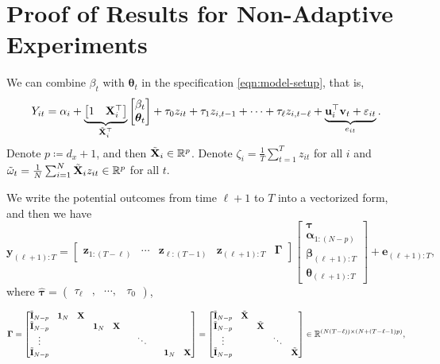 \section{Proof of Results for Non-Adaptive Experiments}\label{sec:constant-proof}

    
    
    
    We can combine $\beta_t$ with $\bm{\theta}_t$ in the specification \eqref{eqn:model-setup}, that is, 
		\[Y_{it}= \alpha_i + \underbrace{\begin{bmatrix}
			1 & \mathbf{X}^\top_i
			\end{bmatrix}}_{\tilde{\mathbf{X}}_i^\top}  \begin{bmatrix}
		\beta_t \\ \bm{\theta}_t
		\end{bmatrix} + \tau_0 z_{it} + \tau_1 z_{i,t-1} + \cdots + \tau_{\ell} z_{i,t-\ell} + \underbrace{\mathbf{u}_i^\top \mathbf{v}_t  + \varepsilon_{it}}_{e_{it}}.\]
		Denote $p \coloneqq d_x + 1$, and then $\tilde{\mathbf{X}}_i \in \mathbb{R}^{p}$. Denote  $\zeta_i = \frac{1}{T} \sum_{t = 1}^T z_{it} $ for all $i$ and $\tilde \omega_t = \frac{1}{N} \sum_{i=1}^N \tilde{\mathbf{X}}_i z_{it} \in \mathbb{R}^{p}$ for all $t$.
    
    
    We write the potential outcomes from time $\ell+1$ to $T$ into a vectorized form, and then we have 
    \[\bm{y}_{(\ell+1):T} = \begin{bmatrix} \bm{z}_{1:(T-\ell)} &  \cdots &  \bm{z}_{\ell:(T-1)} & \bm{z}_{(\ell+1):T} & 
    \bm{\Gamma}
    \end{bmatrix} \begin{bmatrix}
    \bm{\tau} \\ \bm{\alpha}_{1:(N-p)} \\ \bm{\beta}_{(\ell+1):T} \\ \bm{\theta}_{(\ell+1):T}
    \end{bmatrix} + \bm{e}_{(\ell+1):T}, \]
    where $\hat{\bm{\tau}} = \begin{pmatrix} \tau_\ell & , & \cdots, & \tau_0   \end{pmatrix}$,
    
    \[ \bm{\Gamma} = 
		\begin{bmatrix}
		\tilde{\mathbf{I}}_{N-p} & \bm{1}_N & \mathbf{X}  &  &  &  \\
		\tilde{\mathbf{I}}_{N-p} & & &    \bm{1}_N  &  \mathbf{X} & \\
		\vdots & & & & & &  \ddots \\
		\tilde{\mathbf{I}}_{N-p} & & & &   & & & & \bm{1}_N & \mathbf{X}\\
		\end{bmatrix}  = \begin{bmatrix}
		\tilde{\mathbf{I}}_{N-p} & \tilde{\mathbf{X}} \\
		\tilde{\mathbf{I}}_{N-p} & & \tilde{\mathbf{X}} \\
		\vdots & & & \ddots \\
		\tilde{\mathbf{I}}_{N-p} & & & & \tilde{\mathbf{X}} \\
		\end{bmatrix}\in \mathbb{R}^{(N(T - \ell)) \times (N+(T - \ell-1)p)}, \]
		
